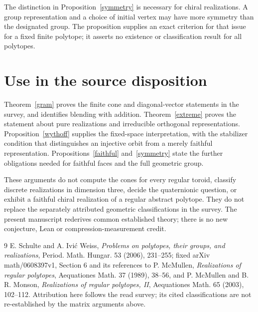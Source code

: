 \documentclass[11pt,a4paper]{article}
\begin{document}
The distinction in Proposition~\ref{symmetry} is necessary for chiral
realizations. A group representation and a choice of initial vertex may
have more symmetry than the designated group. The proposition supplies
an exact criterion for that issue for a fixed finite polytope; it asserts
no existence or classification result for all polytopes.

\section{Use in the source disposition}
Theorem~\ref{gram} proves the finite cone and diagonal-vector statements
in the survey, and identifies blending with addition. Theorem~\ref{extreme}
proves the statement about pure realizations and irreducible orthogonal
representations. Proposition~\ref{wythoff} supplies the fixed-space
interpretation, with the stabilizer condition that distinguishes an
injective orbit from a merely faithful representation.
Propositions~\ref{faithful} and~\ref{symmetry} state the further obligations
needed for faithful faces and the full geometric group.

These arguments do not compute the cones for every regular toroid, classify
discrete realizations in dimension three, decide the quaternionic question,
or exhibit a faithful chiral realization of a regular abstract polytope.
They do not replace the separately attributed geometric classifications
in the survey. The present manuscript rederives common established theory;
there is no new conjecture, Lean or compression-measurement credit.

\begin{thebibliography}{9}\small
{} E. Schulte and A. Ivi\'c Weiss,
\emph{Problems on polytopes, their groups, and realizations},
Period. Math. Hungar. 53 (2006), 231--255; fixed arXiv math/0608397v1,
Section 6 and its references to P. McMullen,
\emph{Realizations of regular polytopes}, Aequationes Math. 37 (1989),
38--56, and P. McMullen and B. R. Monson,
\emph{Realizations of regular polytopes, II}, Aequationes Math. 65 (2003),
102--112. Attribution here follows the read survey; its cited classifications
are not re-established by the matrix arguments above.
\end{thebibliography}
\end{document}
